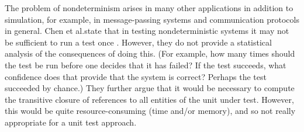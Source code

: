 The problem of nondeterminism arises in many other applications in addition
to simulation, for example, in message-passing systems
\cite{kranzmuller:1998} and communication protocols in general.  Chen et
al.\@ state that in testing nondeterministic systems it may not be
sufficient to run a test once \cite[p.~217]{chen:1994}. However, they do
not provide a statistical analysis of the consequences of doing this.  (For
example, how many times should the test be run before one decides that it
has failed?  If the test succeeds, what confidence does that provide that
the system is correct?  Perhaps the test succeeded by chance.) They further
argue that it would be necessary to compute the transitive closure of
references to all entities of the unit under test.  However, this would be
quite resource-consuming (time and/or memory), and so not really
appropriate for a unit test approach.





% 



